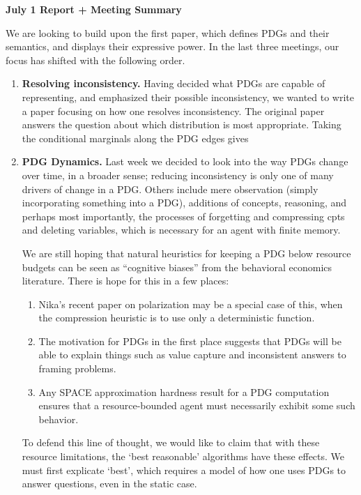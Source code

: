 \documentclass{article}
\theoremstyle{plain}
\theoremstyle{definition}
\theoremstyle{remark}
\begin{document}
	\begin{center}
		\bf\Large July 1 Report + Meeting Summary
	\end{center}
	\medskip
	

	We are looking to build upon the first paper, which defines PDGs and their semantics, and displays their expressive power. 
	In the last three meetings, our focus has shifted with the following order.

	\begin{enumerate}
		\item \textbf{Resolving inconsistency.} Having decided what PDGs are capable of representing, and emphasized their possible inconsistency, we wanted to write a paper focusing on how one resolves inconsistency. The original paper answers the question about which distribution is most appropriate. Taking the conditional marginals along the PDG edges gives 
		
		\item \textbf{PDG Dynamics.} Last week we decided to look into the way PDGs change over time, in a broader sense; reducing inconsistency is only one of many drivers of change in a PDG. Others include mere observation (simply incorporating something into a PDG), additions of concepts, reasoning, and perhaps most importantly, the processes of forgetting and compressing cpts and deleting variables, which is necessary for an agent with finite memory.
		
		We are still hoping that natural heuristics for keeping a PDG below resource budgets can be seen as ``cognitive biases'' from the behavioral economics literature. There is hope for this in a few places:
		\begin{enumerate}
			\item Nika's recent paper on polarization may be a special case of this, when the compression heuristic is to use only a deterministic function. 
			\item The motivation for PDGs in the first place suggests that PDGs will be able to explain things such as value capture and inconsistent answers to framing problems.
			\item Any SPACE approximation hardness result for a PDG computation ensures that a resource-bounded agent must necessarily exhibit some such behavior.
		\end{enumerate}
		To defend this line of thought, we would like to claim that with these resource limitations, the `best reasonable' algorithms have these effects. We must first explicate `best', which requires a model of how one uses PDGs to answer questions, even in the static case.
		

\end{enumerate}
\end{document}

